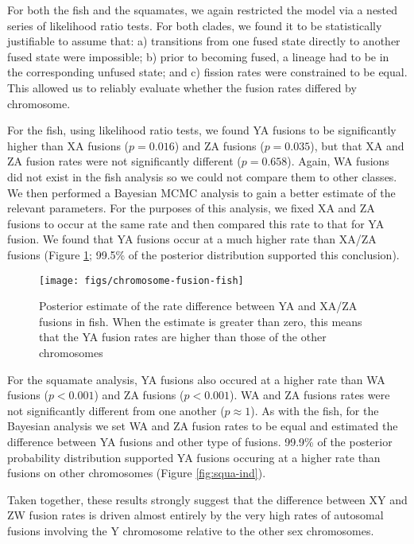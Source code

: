 For both the fish and the squamates, we again restricted the model via a nested series of likelihood ratio tests. For both clades, we found it to be statistically justifiable to assume that: a) transitions from one fused state directly to another fused state were impossible; b) prior to becoming fused, a lineage had to be in the corresponding unfused state; and c) fission rates were constrained to be equal. This allowed us to reliably evaluate whether the fusion rates differed by chromosome.

For the fish, using likelihood ratio tests, we found YA fusions to be significantly higher than XA fusions ($p=\text{0.016}$) and ZA fusions ($p=\text{0.035}$), but that XA and ZA fusion rates were not significantly different ($p=\text{0.658}$). Again, WA fusions did not exist in the fish analysis so we could not compare them to other classes. We then performed a Bayesian MCMC analysis to gain a better estimate of the relevant parameters. For the purposes of this analysis, we fixed XA and ZA fusions to occur at the same rate and then compared this rate to that for YA fusion. We found that YA fusions occur at a much higher rate than XA/ZA fusions (Figure \ref{fig:fish-ind}; 99.5\% of the posterior distribution supported this conclusion).

\begin{figure}[p]
\centering
\texttt{[image: figs/chromosome-fusion-fish]}
\caption[Comparison of Y-autosome and X-/Z-autosome fusion rates (fish)] {Posterior estimate of the rate difference between YA and XA/ZA fusions in fish. When the estimate is greater than zero, this means that the YA fusion rates are higher than those of the other chromosomes}
\label{fig:fish-ind}
\end{figure}

For the squamate analysis, YA fusions also occured at a higher rate than WA fusions ($p<\text{0.001}$) and ZA fusions ($p<\text{0.001}$). WA and ZA fusions rates were not significantly different from one another ($p\approx \text{1}$). As with the fish, for the Bayesian analysis we set WA and ZA fusion rates to be equal and estimated the difference between YA fusions and other type of fusions. 99.9\% of the posterior probability distribution supported YA fusions occuring at a higher rate than fusions on other chromosomes (Figure \ref{fig:squa-ind}). 

Taken together, these results strongly suggest that the difference between XY and ZW fusion rates is driven almost entirely by the very high rates of autosomal fusions involving the Y chromosome relative to the other sex chromosomes.

